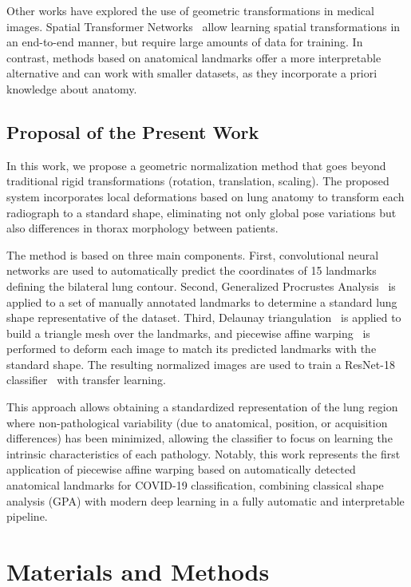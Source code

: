 \documentclass[applsci,article,submit,pdftex,moreauthors]{Definitions/mdpi}
\begin{document}
Other works have explored the use of geometric transformations in medical images. Spatial Transformer Networks~\cite{jaderberg2015spatial} allow learning spatial transformations in an end-to-end manner, but require large amounts of data for training. In contrast, methods based on anatomical landmarks offer a more interpretable alternative and can work with smaller datasets, as they incorporate a priori knowledge about anatomy.

\subsection{Proposal of the Present Work}

In this work, we propose a geometric normalization method that goes beyond traditional rigid transformations (rotation, translation, scaling). The proposed system incorporates local deformations based on lung anatomy to transform each radiograph to a standard shape, eliminating not only global pose variations but also differences in thorax morphology between patients.

The method is based on three main components. First, convolutional neural networks are used to automatically predict the coordinates of 15 landmarks defining the bilateral lung contour. Second, Generalized Procrustes Analysis~\cite{gower1975generalized} is applied to a set of manually annotated landmarks to determine a standard lung shape representative of the dataset. Third, Delaunay triangulation~\cite{delaunay1934sphere} is applied to build a triangle mesh over the landmarks, and piecewise affine warping~\cite{wolberg1990digital} is performed to deform each image to match its predicted landmarks with the standard shape. The resulting normalized images are used to train a ResNet-18 classifier~\cite{he2016deep} with transfer learning.

This approach allows obtaining a standardized representation of the lung region where non-pathological variability (due to anatomical, position, or acquisition differences) has been minimized, allowing the classifier to focus on learning the intrinsic characteristics of each pathology. Notably, this work represents the first application of piecewise affine warping based on automatically detected anatomical landmarks for COVID-19 classification, combining classical shape analysis (GPA) with modern deep learning in a fully automatic and interpretable pipeline.

\section{Materials and Methods}
\end{document}
